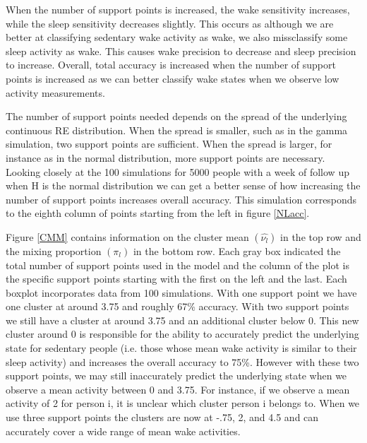 \documentclass{article}
\begin{document}
When the number of support points is increased, the wake sensitivity 
increases, while the sleep sensitivity decreases slightly. This occurs as 
although we are better at classifying sedentary wake activity as wake, 
we also  missclassify some sleep activity as wake. This causes wake 
precision to decrease and sleep precision to increase. Overall, 
total accuracy is increased when the number of support points is increased 
as we can better classify wake states when we observe low activity measurements.


The number of support points needed depends on the spread of the 
underlying continuous RE distribution. When the spread is smaller, 
such as in the gamma simulation, two support points are sufficient. 
When the spread is larger, for instance as in the normal distribution, 
more support points are necessary. Looking closely at the 100 
simulations for 5000 people with a week of follow up when H is 
the normal distribution we can get a better sense of how increasing 
the number of support points increases overall accuracy. 
This simulation corresponds to the eighth column of points starting 
from the left in figure \ref{NLacc}. 

Figure \ref{CMM} contains information on the cluster mean 
$(\hat{\nu_l})$ in the top row and the mixing proportion 
$(\pi_l)$ in the bottom row. Each gray box indicated the 
total number of support points used in the model and the 
column of the plot is the specific support points starting 
with the first on the left and the last. Each boxplot 
incorporates data from 100 simulations. With one support point 
we have one cluster at around 3.75 and roughly 67\% accuracy. 
With two support points we still have a cluster at around 3.75 
and an additional cluster below 0. This new cluster around 0 is 
responsible for the ability to accurately predict the underlying 
state for sedentary people (i.e. those whose mean wake activity 
is similar to their sleep activity) and increases the overall 
accuracy to 75\%. However with these two support points, we may 
still inaccurately predict the underlying state when we observe 
a mean activity between 0 and 3.75. For instance, if we observe 
a mean activity of 2 for person i, it is unclear which cluster 
person i belongs to. When we use three support points the clusters 
are now at -.75, 2, and 4.5 and can accurately cover a wide range 
of mean wake activities. 
\end{document}
